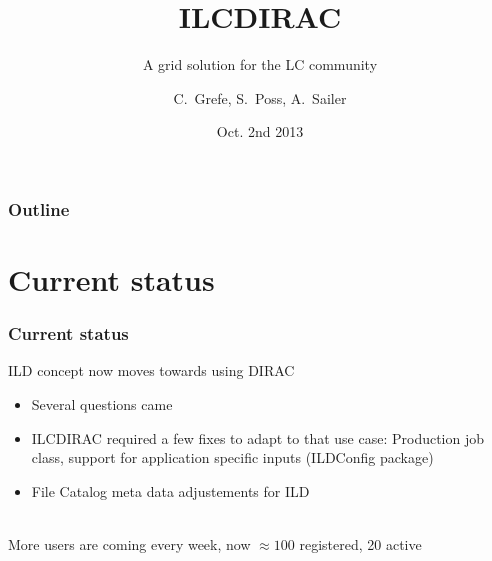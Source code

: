 \documentclass[10pt,table,dvipsnames]{beamer}
\author{C.~Grefe, S.~Poss, A.~Sailer}
\title{ILCDIRAC}
\subtitle{A grid solution for the LC community}
\date{Oct. 2nd 2013}
\institute{CERN}
\begin{document}
\renewcommand{\inserttotalframenumber}{\ref{lastframe}}
\begin{frame}
\titlepage
\end{frame}

\begin{frame}
\frametitle{Outline}
\tableofcontents
\end{frame}

\section{Current status}
\begin{frame}
\frametitle{Current status}
ILD concept now moves towards using DIRAC
\begin{itemize}
\item Several questions came
\item ILCDIRAC required a few fixes to adapt to that use case: Production job class, 
support for application specific inputs (ILDConfig package)
\item File Catalog meta data adjustements for ILD
\end{itemize}
~\\
More users are coming every week, now $\approx 100$ registered, 20 active
\end{frame}
\end{document}
